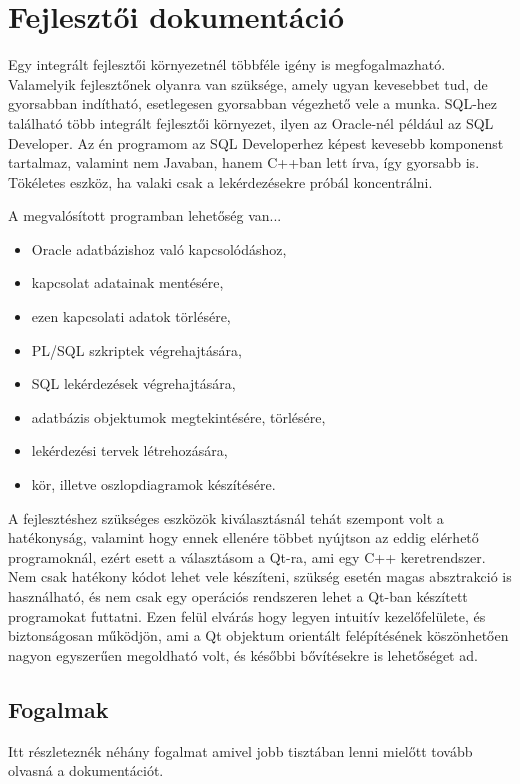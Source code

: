 \chapter{Fejlesztői dokumentáció}

Egy integrált fejlesztői környezetnél többféle igény is megfogalmazható. Valamelyik fejlesztőnek
olyanra van szüksége, amely ugyan kevesebbet tud, de gyorsabban indítható, esetlegesen gyorsabban
végezhető vele a munka. SQL-hez található több integrált fejlesztői környezet, ilyen az Oracle-nél
például az SQL Developer\cite{sqldeveloper}.
Az én programom az SQL Developerhez képest kevesebb komponenst tartalmaz, valamint nem Javaban, hanem C++ban lett írva,
így gyorsabb is. Tökéletes eszköz, ha valaki csak a lekérdezésekre próbál koncentrálni.

A megvalósított programban lehetőség van...
\begin{itemize}
  \item Oracle adatbázishoz való kapcsolódáshoz,
  \item kapcsolat adatainak mentésére,
  \item ezen kapcsolati adatok törlésére,
  \item PL/SQL szkriptek végrehajtására,
  \item SQL lekérdezések végrehajtására,
  \item adatbázis objektumok megtekintésére, törlésére,
  \item lekérdezési tervek létrehozására,
  \item kör, illetve oszlopdiagramok készítésére.
\end{itemize}

A fejlesztéshez szükséges eszközök kiválasztásnál tehát szempont volt a hatékonyság, valamint hogy
ennek ellenére többet nyújtson az eddig elérhető programoknál, ezért esett a választásom a Qt-ra, ami egy C++ keretrendszer.
Nem csak hatékony kódot lehet vele készíteni, szükség esetén magas absztrakció is használható, és nem
csak egy operációs rendszeren lehet a Qt-ban készített programokat futtatni. Ezen felül elvárás hogy legyen intuitív kezelőfelülete,
és biztonságosan működjön, ami a Qt objektum orientált felépítésének köszönhetően nagyon egyszerűen megoldható volt, és későbbi
bővítésekre is lehetőséget ad.

\section{Fogalmak}
Itt részleteznék néhány fogalmat amivel jobb tisztában lenni mielőtt tovább olvasná a dokumentációt.

